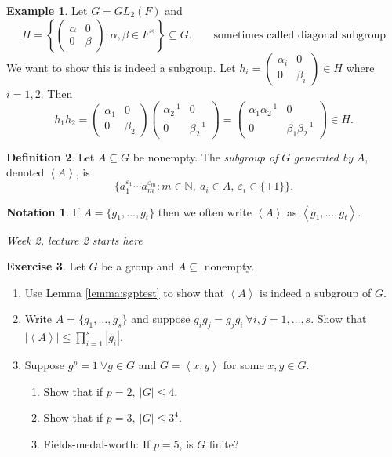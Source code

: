 \documentclass[a4paper]{article}
\newcommand{\la}{\left\langle}
\newcommand{\ra}{\right\rangle}
\newcommand{\N}{\mathbb{N}}
\theoremstyle{definition}
\newtheorem{defn}{Definition}[subsection]
\newtheorem{example}[defn]{Example}
\newtheorem{exe}[defn]{Exercise}
\newtheorem*{notation}{Notation}
\begin{document}
\begin{example}
Let $G=GL_2(F)$ and
\[
H=\left\{\begin{pmatrix}
  \alpha & 0 \\ 0 & \beta
\end{pmatrix}:\alpha,\beta\in F^{\times}\right\} \subseteq G. \qquad\text{sometimes called diagonal subgroup}
\]
We want to show this is indeed a subgroup. Let $h_i=\begin{pmatrix}
  \alpha_i & 0 \\ 0 & \beta_i
\end{pmatrix}\in H$ where $i=1,2$. Then
\[
h_1h_2=\begin{pmatrix}
  \alpha_1 & 0 \\ 0 & \beta_2
\end{pmatrix}\begin{pmatrix}
  \alpha_2^{-1} & 0 \\ 0 & \beta_2^{-1}
\end{pmatrix}=\begin{pmatrix}
  \alpha_1 \alpha_2^{-1} & 0 \\ 0 & \beta_1\beta_2^{-1}
\end{pmatrix}\in H .
\]
\end{example}
\begin{defn}
Let $A\subseteq G$ be nonempty. The \textit{subgroup of} $G$ \textit{generated by} $A$, denoted $\la A\ra$, is
\[
\{a_1^{\varepsilon_1}\cdots a_m^{\varepsilon_m}:m\in\N,\ a_i\in A,\ \varepsilon_i\in\{\pm 1\}\}.
\]
\end{defn}
\begin{notation}
If $A=\{g_1,\ldots,g_t\}$ then we often write $\la A\ra$ as $\la g_1,\ldots,g_t\ra$.
\end{notation}

\begin{flushright}
\textit{Week 2, lecture 2 starts here}
\end{flushright}

\begin{exe}
Let $G$ be a group and $A\subseteq$ nonempty.
\begin{enumerate}
\item Use Lemma \ref{lemma:sgptest} to show that $\la A\ra$ is indeed a subgroup of $G$.
\item Write $A=\{g_1,\ldots,g_s\}$ and suppose $g_ig_j=g_jg_i \ \forall i,j=1,\ldots,s$. Show that $|\la A\ra|\leq \prod_{i=1}^s |g_i|$.
\item Suppose $g^p=1 \ \forall g\in G$ and $G=\la x,y\ra$ for some $x,y\in G$.
\begin{enumerate}
\item Show that if $p=2,\ |G|\leq 4$.
\item Show that if $p=3,\ |G|\leq 3^4$.
\item Fields-medal-worth: If $p=5$, is $G$ finite?
\end{enumerate}
\end{enumerate}
\end{exe}
\end{document}
